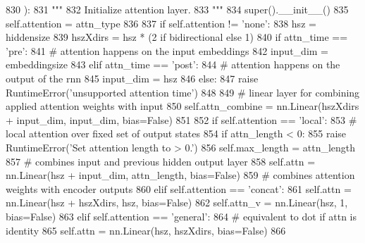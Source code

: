 \begin{DoxyCode}
830     ):
831         \textcolor{stringliteral}{"""}
832 \textcolor{stringliteral}{        Initialize attention layer.}
833 \textcolor{stringliteral}{        """}
834         super().\_\_init\_\_()
835         self.attention = attn\_type
836 
837         \textcolor{keywordflow}{if} self.attention != \textcolor{stringliteral}{'none'}:
838             hsz = hiddensize
839             hszXdirs = hsz * (2 \textcolor{keywordflow}{if} bidirectional \textcolor{keywordflow}{else} 1)
840             \textcolor{keywordflow}{if} attn\_time == \textcolor{stringliteral}{'pre'}:
841                 \textcolor{comment}{# attention happens on the input embeddings}
842                 input\_dim = embeddingsize
843             \textcolor{keywordflow}{elif} attn\_time == \textcolor{stringliteral}{'post'}:
844                 \textcolor{comment}{# attention happens on the output of the rnn}
845                 input\_dim = hsz
846             \textcolor{keywordflow}{else}:
847                 \textcolor{keywordflow}{raise} RuntimeError(\textcolor{stringliteral}{'unsupported attention time'})
848 
849             \textcolor{comment}{# linear layer for combining applied attention weights with input}
850             self.attn\_combine = nn.Linear(hszXdirs + input\_dim, input\_dim, bias=\textcolor{keyword}{False})
851 
852             \textcolor{keywordflow}{if} self.attention == \textcolor{stringliteral}{'local'}:
853                 \textcolor{comment}{# local attention over fixed set of output states}
854                 \textcolor{keywordflow}{if} attn\_length < 0:
855                     \textcolor{keywordflow}{raise} RuntimeError(\textcolor{stringliteral}{'Set attention length to > 0.'})
856                 self.max\_length = attn\_length
857                 \textcolor{comment}{# combines input and previous hidden output layer}
858                 self.attn = nn.Linear(hsz + input\_dim, attn\_length, bias=\textcolor{keyword}{False})
859                 \textcolor{comment}{# combines attention weights with encoder outputs}
860             \textcolor{keywordflow}{elif} self.attention == \textcolor{stringliteral}{'concat'}:
861                 self.attn = nn.Linear(hsz + hszXdirs, hsz, bias=\textcolor{keyword}{False})
862                 self.attn\_v = nn.Linear(hsz, 1, bias=\textcolor{keyword}{False})
863             \textcolor{keywordflow}{elif} self.attention == \textcolor{stringliteral}{'general'}:
864                 \textcolor{comment}{# equivalent to dot if attn is identity}
865                 self.attn = nn.Linear(hsz, hszXdirs, bias=\textcolor{keyword}{False})
866 
\end{DoxyCode}


